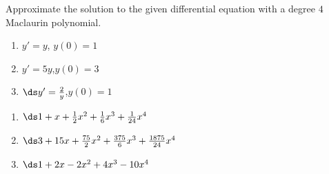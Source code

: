 \begin{enumialphparenastyle}
\begin{ex}
\end{ex}

\begin{ex}
Approximate the solution to the given differential equation with a degree $ 4 $ Maclaurin polynomial.
\begin{enumerate}
\item {$y'=y$, \qquad $y(0) = 1$
}
\item {$y'=5y$,\qquad $y(0) = 3$
}
\item {$\ds y'=\frac2y$,\qquad $y(0) = 1$
}

\end{enumerate}

\begin{sol}
\begin{enumerate}
\item 
{$\ds 1+x+\frac12x^2+\frac16x^3+\frac1{24}x^4$
}
\item 
{$\ds 3+15x+\frac{75}{2}x^2+\frac{375}{6}x^3+\frac{1875}{24}x^4$
}
\item 
{$\ds 1+2x-2x^2+4x^3-10x^4$
}

\end{enumerate}
\end{sol}

\end{ex}

\end{enumialphparenastyle}




